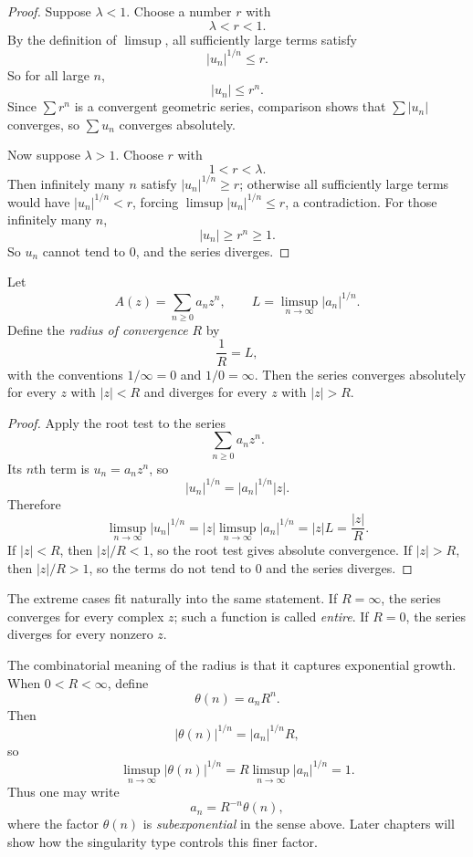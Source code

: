 \begin{proof}
Suppose $\lambda < 1$. Choose a number $r$ with
\[
  \lambda < r < 1.
\]
By the definition of $\limsup$, all sufficiently large terms satisfy
\[
  |u_n|^{1/n} \le r.
\]
So for all large $n$,
\[
  |u_n| \le r^n.
\]
Since $\sum r^n$ is a convergent geometric series, comparison shows that $\sum |u_n|$ converges, so $\sum u_n$ converges absolutely.

Now suppose $\lambda > 1$. Choose $r$ with
\[
  1 < r < \lambda.
\]
Then infinitely many $n$ satisfy $|u_n|^{1/n} \ge r$; otherwise all sufficiently large terms would have $|u_n|^{1/n} < r$, forcing $\limsup |u_n|^{1/n} \le r$, a contradiction. For those infinitely many $n$,
\[
  |u_n| \ge r^n \ge 1.
\]
So $u_n$ cannot tend to $0$, and the series diverges.
\end{proof}

\begin{theorem}
Let
\[
  A(z) = \sum_{n \ge 0} a_n z^n,
  \qquad
  L = \limsup_{n \to \infty} |a_n|^{1/n}.
\]
Define the \emph{radius of convergence} $R$ by
\[
  \frac{1}{R} = L,
\]
with the conventions $1/\infty = 0$ and $1/0 = \infty$. Then the series converges absolutely for every $z$ with $|z|<R$ and diverges for every $z$ with $|z|>R$.
\end{theorem}

\begin{proof}
Apply the root test to the series
\[
  \sum_{n \ge 0} a_n z^n.
\]
Its $n$th term is $u_n = a_n z^n$, so
\[
  |u_n|^{1/n} = |a_n|^{1/n}|z|.
\]
Therefore
\[
  \limsup_{n \to \infty} |u_n|^{1/n}
  = |z| \limsup_{n \to \infty} |a_n|^{1/n}
  = |z|L
  = \frac{|z|}{R}.
\]
If $|z|<R$, then $|z|/R < 1$, so the root test gives absolute convergence. If $|z|>R$, then $|z|/R > 1$, so the terms do not tend to $0$ and the series diverges.
\end{proof}

The extreme cases fit naturally into the same statement. If $R=\infty$, the series converges for every complex $z$; such a function is called \emph{entire}. If $R=0$, the series diverges for every nonzero $z$.

The combinatorial meaning of the radius is that it captures exponential growth. When $0<R<\infty$, define
\[
  \theta(n) = a_n R^n.
\]
Then
\[
  |\theta(n)|^{1/n} = |a_n|^{1/n}R,
\]
so
\[
  \limsup_{n \to \infty} |\theta(n)|^{1/n}
  = R \limsup_{n \to \infty} |a_n|^{1/n}
  = 1.
\]
Thus one may write
\[
  a_n = R^{-n}\theta(n),
\]
where the factor $\theta(n)$ is \emph{subexponential} in the sense above. Later chapters will show how the singularity type controls this finer factor.

